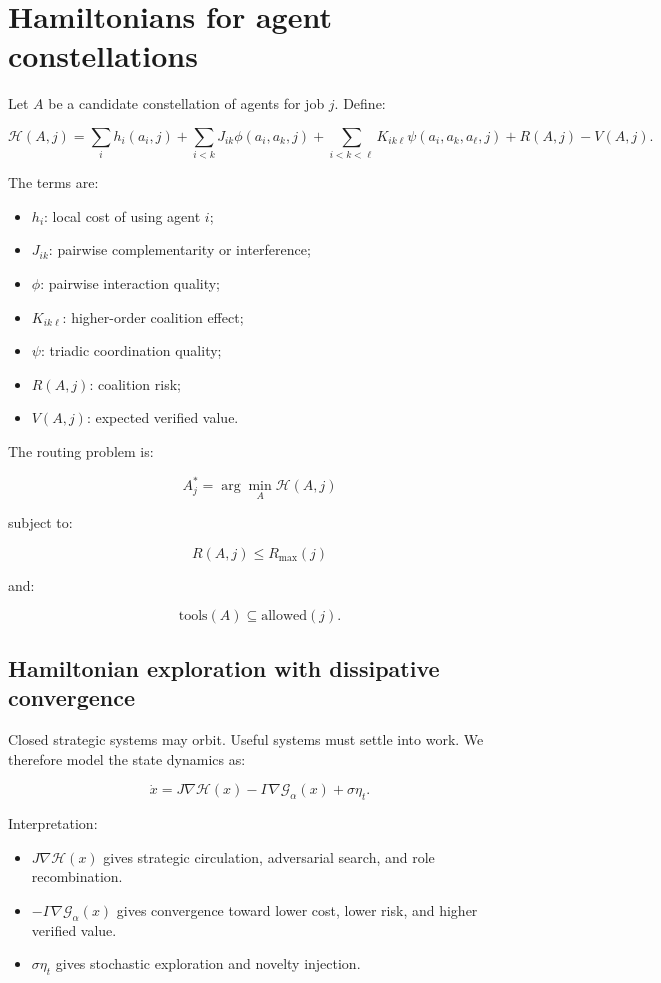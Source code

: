 \documentclass[
  11pt,
]{article}
\providecommand{\tightlist}{%
  \setlength{\itemsep}{0pt}\setlength{\parskip}{0pt}}
\begin{document}
\section{Hamiltonians for agent
constellations}\label{hamiltonians-for-agent-constellations}

Let \(A\) be a candidate constellation of agents for job \(j\). Define:

\[
\mathcal{H}(A,j)=
\sum_i h_i(a_i,j)
+
\sum_{i<k}J_{ik}\phi(a_i,a_k,j)
+
\sum_{i<k<\ell}K_{ik\ell}\psi(a_i,a_k,a_\ell,j)
+R(A,j)-V(A,j).
\]

The terms are:

\begin{itemize}
\tightlist
\item
  \(h_i\): local cost of using agent \(i\);
\item
  \(J_{ik}\): pairwise complementarity or interference;
\item
  \(\phi\): pairwise interaction quality;
\item
  \(K_{ik\ell}\): higher-order coalition effect;
\item
  \(\psi\): triadic coordination quality;
\item
  \(R(A,j)\): coalition risk;
\item
  \(V(A,j)\): expected verified value.
\end{itemize}

The routing problem is:

\[
A^*_j=\arg\min_A\mathcal{H}(A,j)
\]

subject to:

\[
R(A,j)\leq R_{\max}(j)
\]

and:

\[
\text{tools}(A)\subseteq \text{allowed}(j).
\]

\subsection{Hamiltonian exploration with dissipative
convergence}\label{hamiltonian-exploration-with-dissipative-convergence}

Closed strategic systems may orbit. Useful systems must settle into
work. We therefore model the state dynamics as:

\[
\dot{x}=J\nabla\mathcal{H}(x)-\Gamma\nabla\mathcal{G}_{\alpha}(x)+\sigma\eta_t.
\]

Interpretation:

\begin{itemize}
\tightlist
\item
  \(J\nabla\mathcal{H}(x)\) gives strategic circulation, adversarial
  search, and role recombination.
\item
  \(-\Gamma\nabla\mathcal{G}_{\alpha}(x)\) gives convergence toward
  lower cost, lower risk, and higher verified value.
\item
  \(\sigma\eta_t\) gives stochastic exploration and novelty injection.
\end{itemize}
\end{document}
